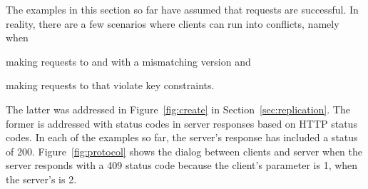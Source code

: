 The examples in this section so far have assumed that requests are successful.
In reality, there are a few scenarios where clients can run into conflicts,
namely when
\begin{inparaenum}
\item making requests to \sync and \create with a mismatching version and
\item making requests to \create that violate key constraints. 
\end{inparaenum}
The latter was addressed in Figure~\ref{fig:create} in
Section~\ref{sec:replication}. The former is addressed with status codes in
server responses based on HTTP status codes. In each of the examples so far, the server's response has
included a status of 200. Figure~\ref{fig:protocol} shows the dialog between
clients and server when the server responds with a 409 status code because the
client's  parameter is 1, when the server's is 2.



